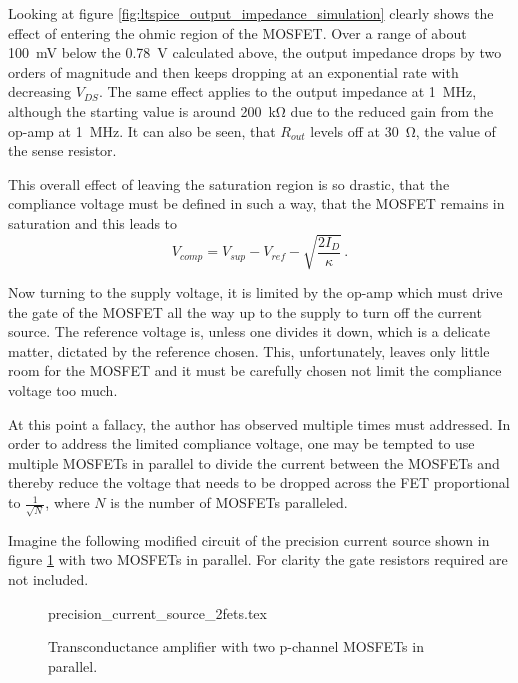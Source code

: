 Looking at figure \ref{fig:ltspice_output_impedance_simulation} clearly shows the effect of entering the ohmic region of the MOSFET. Over a range of about \qty{100}{\mV} below the \qty{0.78}{\V} calculated above, the output impedance drops by two orders of magnitude and then keeps dropping at an exponential rate with decreasing $V_{DS}$. The same effect applies to the output impedance at \qty{1}{\MHz}, although the starting value is around \qty{200}{\kilo\ohm} due to the reduced gain from the op-amp at \qty{1}{\MHz}. It can also be seen, that $R_{out}$ levels off at \qty{30}{\ohm}, the value of the sense resistor.

This overall effect of leaving the saturation region is so drastic, that the compliance voltage must be defined in such a way, that the MOSFET remains in saturation and this leads to
\begin{equation}
    V_{comp} = V_{sup} - V_{ref} - \sqrt{\frac{2 I_D}{\kappa}} \,.
\end{equation}

Now turning to the supply voltage, it is limited by the op-amp which must drive the gate of the MOSFET all the way up to the supply to turn off the current source. The reference voltage is, unless one divides it down, which is a delicate matter, dictated by the reference chosen. This, unfortunately, leaves only little room for the MOSFET and it must be carefully chosen not limit the compliance voltage too much.

At this point a fallacy, the author has observed multiple times must addressed. In order to address the limited compliance voltage, one may be tempted to use multiple MOSFETs in parallel to divide the current between the MOSFETs and thereby reduce the voltage that needs to be dropped across the FET proportional to $\frac{1}{\sqrt{N}}$, where $N$ is the number of MOSFETs paralleled.

Imagine the following modified circuit of the precision current source shown in figure \ref{fig:precision_current_source_two_mosfets} with two MOSFETs in parallel. For clarity the gate resistors required are not included.

\begin{figure}[ht]
    \centering
    {precision_current_source_2fets.tex}
    \caption{Transconductance amplifier with two p-channel MOSFETs in parallel.}
    \label{fig:precision_current_source_two_mosfets}
\end{figure}

